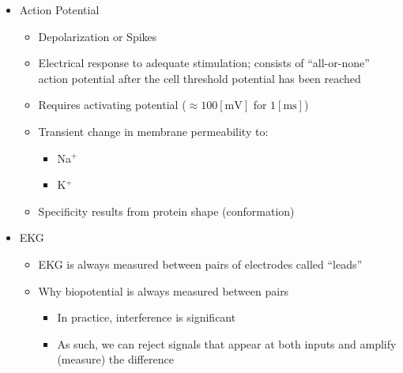 \begin{itemize}

  \item Action Potential

    \begin{itemize}

      \item Depolarization or Spikes

      \item Electrical response to adequate stimulation; consists of ``all-or-none'' action potential after the cell threshold potential has been reached

      \item Requires activating potential ($\approx 100[\si{\milli\volt}]$ for $1[\si{\milli\second}]$)

      \item Transient change in membrane permeability to:

        \begin{itemize}

          \item Na$^+$

          \item K$^+$

        \end{itemize}

      \item Specificity results from protein shape (conformation)

    \end{itemize}

  \item EKG

    \begin{itemize}

      \item EKG is always measured between pairs of electrodes called ``leads''

      \item Why biopotential is always measured between pairs

        \begin{itemize}

          \item In practice, interference is significant

          \item As such, we can reject signals that appear at both inputs and amplify (measure) the difference

        \end{itemize}

    \end{itemize}

\end{itemize}



